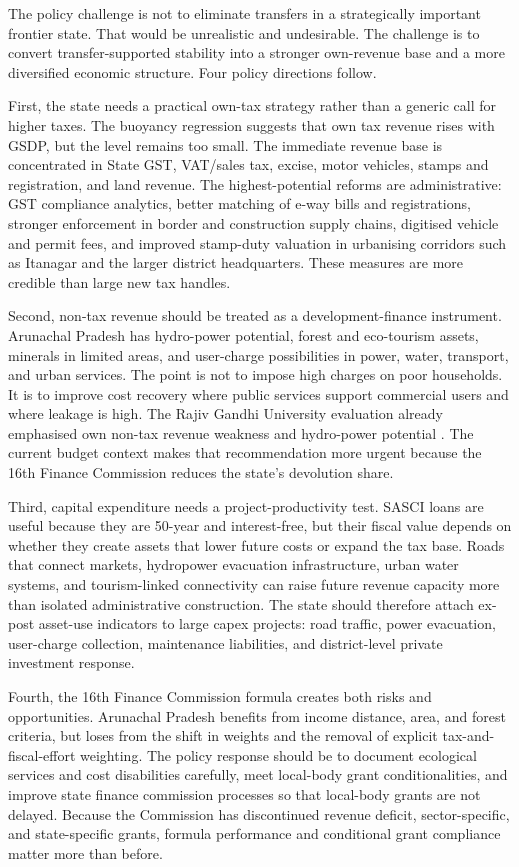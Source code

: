 \documentclass[11pt,a4paper]{article}
\begin{document}
The policy challenge is not to eliminate transfers in a strategically important frontier state. That would be unrealistic and undesirable. The challenge is to convert transfer-supported stability into a stronger own-revenue base and a more diversified economic structure. Four policy directions follow.

First, the state needs a practical own-tax strategy rather than a generic call for higher taxes. The buoyancy regression suggests that own tax revenue rises with GSDP, but the level remains too small. The immediate revenue base is concentrated in State GST, VAT/sales tax, excise, motor vehicles, stamps and registration, and land revenue. The highest-potential reforms are administrative: GST compliance analytics, better matching of e-way bills and registrations, stronger enforcement in border and construction supply chains, digitised vehicle and permit fees, and improved stamp-duty valuation in urbanising corridors such as Itanagar and the larger district headquarters. These measures are more credible than large new tax handles.

Second, non-tax revenue should be treated as a development-finance instrument. Arunachal Pradesh has hydro-power potential, forest and eco-tourism assets, minerals in limited areas, and user-charge possibilities in power, water, transport, and urban services. The point is not to impose high charges on poor households. It is to improve cost recovery where public services support commercial users and where leakage is high. The Rajiv Gandhi University evaluation already emphasised own non-tax revenue weakness and hydro-power potential \cite{nayak_rgu_2019}. The current budget context makes that recommendation more urgent because the 16th Finance Commission reduces the state's devolution share.

Third, capital expenditure needs a project-productivity test. SASCI loans are useful because they are 50-year and interest-free, but their fiscal value depends on whether they create assets that lower future costs or expand the tax base. Roads that connect markets, hydropower evacuation infrastructure, urban water systems, and tourism-linked connectivity can raise future revenue capacity more than isolated administrative construction. The state should therefore attach ex-post asset-use indicators to large capex projects: road traffic, power evacuation, user-charge collection, maintenance liabilities, and district-level private investment response.

Fourth, the 16th Finance Commission formula creates both risks and opportunities. Arunachal Pradesh benefits from income distance, area, and forest criteria, but loses from the shift in weights and the removal of explicit tax-and-fiscal-effort weighting. The policy response should be to document ecological services and cost disabilities carefully, meet local-body grant conditionalities, and improve state finance commission processes so that local-body grants are not delayed. Because the Commission has discontinued revenue deficit, sector-specific, and state-specific grants, formula performance and conditional grant compliance matter more than before.
\end{document}
